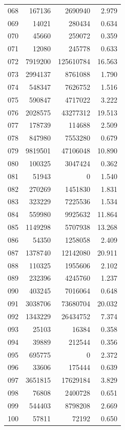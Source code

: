 \documentclass[anonymous,notoc]{gmcm2026}
\begin{document}
\begin{longtable}{lrrr}
068 & 167136 & 2690940 & 2.979 \\
069 & 14021 & 280434 & 0.634 \\
070 & 45660 & 259072 & 0.359 \\
071 & 12080 & 245778 & 0.633 \\
072 & 7919200 & 125610784 & 16.563 \\
073 & 2994137 & 8761088 & 1.790 \\
074 & 548347 & 7626752 & 1.516 \\
075 & 590847 & 4717022 & 3.222 \\
076 & 2028575 & 43277312 & 19.513 \\
077 & 178739 & 114688 & 2.509 \\
078 & 847980 & 7553280 & 0.679 \\
079 & 9819501 & 47106048 & 10.890 \\
080 & 100325 & 3047424 & 0.362 \\
081 & 51943 & 0 & 1.540 \\
082 & 270269 & 1451830 & 1.831 \\
083 & 323229 & 7225536 & 1.534 \\
084 & 559980 & 9925632 & 11.864 \\
085 & 1149298 & 5707938 & 13.268 \\
086 & 54350 & 1258058 & 2.409 \\
087 & 1378740 & 12142080 & 20.911 \\
088 & 110325 & 1955606 & 2.102 \\
089 & 232396 & 4245760 & 1.237 \\
090 & 403245 & 7016064 & 0.648 \\
091 & 3038706 & 73680704 & 20.032 \\
092 & 1343229 & 26434752 & 7.374 \\
093 & 25103 & 16384 & 0.358 \\
094 & 39889 & 212544 & 0.356 \\
095 & 695775 & 0 & 2.372 \\
096 & 33606 & 175444 & 0.639 \\
097 & 3651815 & 17629184 & 3.829 \\
098 & 76808 & 2400728 & 0.651 \\
099 & 544403 & 8798208 & 2.669 \\
100 & 57811 & 72192 & 0.650 \\
\end{longtable}
\end{document}
